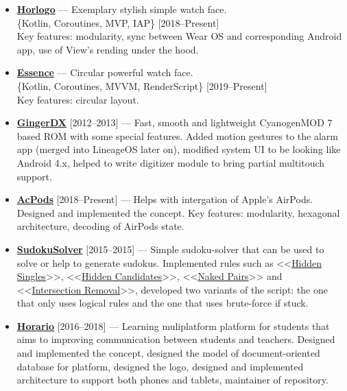 \documentclass[a4paper]{article}
\begin{document}
\begin{itemize}
		\item \faAndroid \href{https://github.com/AChep/horlogo}{\textbf{Horlogo}} --- Exemplary stylish simple watch face. \\[0.2em]
		{\footnotesize \{Kotlin, Coroutines, MVP, IAP\} \hfill [2018--Present]} \\[0.2em]
		Key features: modularity, sync between Wear OS and corresponding Android app, use of View's rending under the hood.   
		
		\item \faAndroid \href{https://play.google.com/store/apps/details?id=com.artemchep.essence}{\textbf{Essence}} --- Circular powerful watch face. \\[0.2em]
		{\footnotesize \{Kotlin, Coroutines, MVVM, RenderScript\} \hfill [2019--Present]} \\[0.2em]
		Key features: circular layout.   
	\end{itemize}
	\begin{multicols}{2}
	\begin{itemize}
		\item \faAndroid \href{https://forum.xda-developers.com/showthread.php?t=1188486}{\textbf{GingerDX}} [2012--2013] --- Fast, smooth and lightweight CyanogenMOD 7 based ROM with some special features. Added motion gestures to the alarm app (merged into LineageOS later on), modified system UI to be looking like Android 4.x, helped to write digitizer module to bring partial multitouch support.

		\item \faAndroid \href{https://github.com/AChep/acpods}{\textbf{AcPods}} [2018--Present] --- Helps with intergation of Apple's AirPods. Designed and implemented the concept. Key features: modularity, hexagonal architecture, decoding of AirPods state.   
		
		\item \faDeskop \href{https://github.com/AChep/SudokuSolver}{\textbf{SudokuSolver}} [2015--2015] --- Simple sudoku-solver that can be used to solve or help to generate sudokus. Implemented rules such as <<\href{http://www.sudokuwiki.org/Getting_Started}{Hidden Singles}>>, <<\href{http://www.sudokuwiki.org/Hidden_Candidates}{Hidden Candidates}>>, <<\href{http://www.sudokuwiki.org/Naked_Candidates#NP}{Naked Pairs}>> and <<\href{http://www.sudokuwiki.org/intersection_removal}{Intersection Removal}>>, developed two variants of the script: the one that only uses logical rules and the one that uses brute-force if stuck.
		
		\item \faAndroid \href{http://artemchep.com/horario/}{\textbf{Horario}} [2016--2018] --- Learning muliplatform platform for students that aims to improving communication between students and teachers. Designed and implemented the concept, designed the model of document-oriented database for platform, designed the logo, designed and implemented architecture to support both phones and tablets, maintainer of repository. 
	\end{itemize}
	\end{multicols}
	
\end{document}
